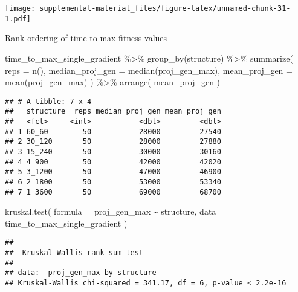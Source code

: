 \documentclass[
]{book}
\newenvironment{Shaded}{\begin{snugshade}}{\end{snugshade}}
\newcommand{\AttributeTok}[1]{\textcolor[rgb]{0.77,0.63,0.00}{#1}}
\newcommand{\FunctionTok}[1]{\textcolor[rgb]{0.00,0.00,0.00}{#1}}
\newcommand{\NormalTok}[1]{#1}
\newcommand{\SpecialCharTok}[1]{\textcolor[rgb]{0.00,0.00,0.00}{#1}}
\begin{document}
\texttt{[image: supplemental-material\_files/figure-latex/unnamed-chunk-31-1.pdf]}

Rank ordering of time to max fitness values

\begin{Shaded}
\begin{Highlighting}[]
\NormalTok{time\_to\_max\_single\_gradient }\SpecialCharTok{\%\textgreater{}\%}
  \FunctionTok{group\_by}\NormalTok{(structure) }\SpecialCharTok{\%\textgreater{}\%}
  \FunctionTok{summarize}\NormalTok{(}
    \AttributeTok{reps =} \FunctionTok{n}\NormalTok{(),}
    \AttributeTok{median\_proj\_gen =} \FunctionTok{median}\NormalTok{(proj\_gen\_max),}
    \AttributeTok{mean\_proj\_gen =} \FunctionTok{mean}\NormalTok{(proj\_gen\_max)}
\NormalTok{  ) }\SpecialCharTok{\%\textgreater{}\%}
  \FunctionTok{arrange}\NormalTok{(}
\NormalTok{    mean\_proj\_gen}
\NormalTok{  )}
\end{Highlighting}
\end{Shaded}

\begin{verbatim}
## # A tibble: 7 x 4
##   structure  reps median_proj_gen mean_proj_gen
##   <fct>     <int>           <dbl>         <dbl>
## 1 60_60        50           28000         27540
## 2 30_120       50           28000         27880
## 3 15_240       50           30000         30160
## 4 4_900        50           42000         42020
## 5 3_1200       50           47000         46900
## 6 2_1800       50           53000         53340
## 7 1_3600       50           69000         68700
\end{verbatim}

\begin{Shaded}
\begin{Highlighting}[]
\FunctionTok{kruskal.test}\NormalTok{(}
  \AttributeTok{formula =}\NormalTok{ proj\_gen\_max }\SpecialCharTok{\textasciitilde{}}\NormalTok{ structure,}
  \AttributeTok{data =}\NormalTok{ time\_to\_max\_single\_gradient}
\NormalTok{)}
\end{Highlighting}
\end{Shaded}

\begin{verbatim}
## 
##  Kruskal-Wallis rank sum test
## 
## data:  proj_gen_max by structure
## Kruskal-Wallis chi-squared = 341.17, df = 6, p-value < 2.2e-16
\end{verbatim}
\end{document}
